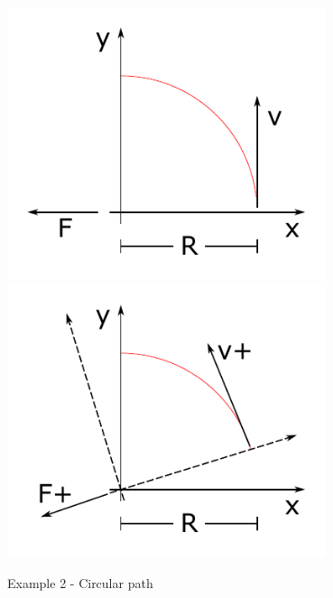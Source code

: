 \begin{minipage}{0.39\textwidth}
	\centering
	\includegraphics[width=0.7\textwidth]{01_figures/basics_cos_intuition_3}
	\label{fig:basics_cos_intuition_1}
	\vspace{5mm}
	\includegraphics[width=0.7\textwidth]{01_figures/basics_cos_intuition_4}
	\label{fig:basics_cos_intuition_2}
\end{minipage}

\clearpage


Example 2 - Circular path

